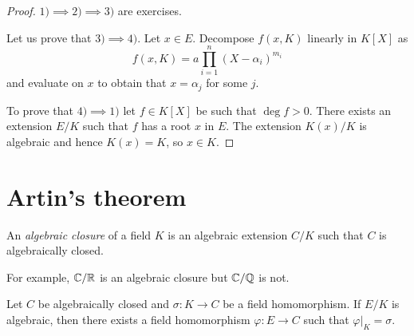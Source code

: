 \begin{proof}
	$1)\implies 2)\implies 3)$ are exercises.  
	
	Let us prove that $3)\implies
	4)$. Let $x\in E$. Decompose $f(x,K)$ linearly in $K[X]$ as
	\[
        f(x,K)=a\prod_{i=1}^n(X-\alpha_i)^{m_i}
        \]
        and evaluate on $x$ to obtain that
	$x=\alpha_j$ for some $j$. 
	
	To prove that $4)\implies 1)$ let $f\in K[X]$ be
	such that $\deg f>0$. There exists an extension $E/K$ such that $f$ has a
	root $x$ in $E$. The extension $K(x)/K$ is algebraic and hence $K(x)=K$, so
	$x\in K$. 
\end{proof}



\section{Artin's theorem}

\begin{definition}
	An \emph{algebraic closure} of a field $K$ is an algebraic extension $C/K$ 
	such that $C$ is algebraically closed. 
\end{definition}

For example, $\mathbb{C}/\mathbb{R}$ is an algebraic closure but $\mathbb{C}/\mathbb{Q}$ is not. 

\begin{proposition}
\label{pro:Artin}
	Let $C$ be algebraically closed and $\sigma\colon K\to C$ be a field homomorphism. If $E/K$ 
	is algebraic, then there exists a field homomorphism 
	$\varphi\colon E\to C$ such that 
	$\varphi|_K=\sigma$. 
\end{proposition}

